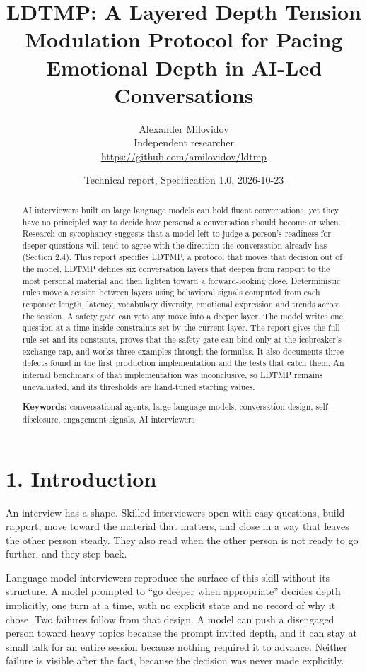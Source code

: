 \documentclass[11pt]{article}
\title{LDTMP: A Layered Depth Tension Modulation Protocol for Pacing
Emotional Depth in AI-Led Conversations}
\author{Alexander
Milovidov\\[2pt]\small Independent researcher\\\small\url{https://github.com/amilovidov/ldtmp}}
\date{Technical report, Specification 1.0, 2026-10-23}
\begin{document}
\maketitle
\thispagestyle{empty}

\begin{abstract}
AI interviewers built on large language models can hold fluent
conversations, yet they have no principled way to decide how personal a
conversation should become or when. Research on sycophancy suggests that
a model left to judge a person's readiness for deeper questions will
tend to agree with the direction the conversation already has (Section
2.4). This report specifies LDTMP, a protocol that moves that decision
out of the model. LDTMP defines six conversation layers that deepen from
rapport to the most personal material and then lighten toward a
forward-looking close. Deterministic rules move a session between layers
using behavioral signals computed from each response: length, latency,
vocabulary diversity, emotional expression and trends across the
session. A safety gate can veto any move into a deeper layer. The model
writes one question at a time inside constraints set by the current
layer. The report gives the full rule set and its constants, proves that
the safety gate can bind only at the icebreaker's exchange cap, and
works three examples through the formulas. It also documents three
defects found in the first production implementation and the tests that
catch them. An internal benchmark of that implementation was
inconclusive, so LDTMP remains unevaluated, and its thresholds are
hand-tuned starting values.

\medskip
\noindent\textbf{Keywords:} conversational agents, large language models, conversation design,
self-disclosure, engagement signals, AI interviewers
\end{abstract}

\section{1. Introduction}

An interview has a shape. Skilled interviewers open with easy questions,
build rapport, move toward the material that matters, and close in a way
that leaves the other person steady. They also read when the other
person is not ready to go further, and they step back.

Language-model interviewers reproduce the surface of this skill without
its structure. A model prompted to ``go deeper when appropriate''
decides depth implicitly, one turn at a time, with no explicit state and
no record of why it chose. Two failures follow from that design. A model
can push a disengaged person toward heavy topics because the prompt
invited depth, and it can stay at small talk for an entire session
because nothing required it to advance. Neither failure is visible after
the fact, because the decision was never made explicitly.
\end{document}
